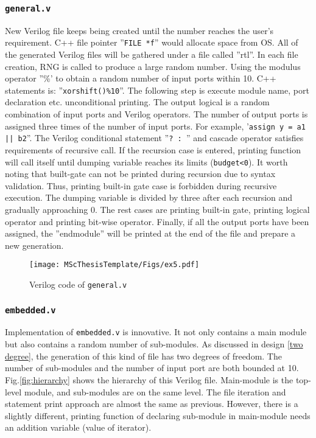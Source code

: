 \subsubsection{\texttt{general.v}}
New Verilog file keeps being created until the number reaches the user's requirement. C++ file pointer ''\texttt{FILE *f}'' would allocate space from OS. All of the generated Verilog files will be gathered under a file called ''rtl''. In each file creation, RNG is called to produce a large random number. Using the modulus operator ''\%' to obtain a random number of input ports within 10. C++ statements is: ''\texttt{xorshift()\%10}''. The following step is execute module name, port declaration etc. unconditional printing. The output logical is a random combination of input ports and Verilog operators. The number of output ports is assigned three times of the number of input ports. For example, '\texttt{assign y = a1 || b2}''. The Verilog conditional statement ''\texttt{? : }'' and  cascade operator satisfies requirements of recursive call. If the recursion case is entered, printing function will call itself until dumping variable reaches its limits (\texttt{budget<0}). It worth noting that built-gate can not be printed during recursion due to syntax validation. Thus, printing built-in gate case is forbidden during recursive execution. The dumping variable is divided by three after each recursion and gradually approaching 0. The rest cases are printing built-in gate, printing logical operator and printing bit-wise operator. Finally, if all the output ports have been assigned, the ''endmodule'' will be printed at the end of the file and prepare a new generation.
\begin{figure}[htb]
    \centering
    \texttt{[image: MScThesisTemplate/Figs/ex5.pdf]}
    \caption{\footnotesize Verilog code of \texttt{general.v}}
\end{figure}
\subsubsection{\texttt{embedded.v}}
Implementation of \texttt{embedded.v} is innovative. It not only contains a main module but also contains a random number of sub-modules. As discussed in design \ref{two degree}, the generation of this kind of file has two degrees of freedom. The number of sub-modules and the number of input port are both bounded at 10. Fig.\ref{fig:hierarchy} shows the hierarchy of this Verilog file. Main-module is the top-level module, and sub-modules are on the same level. The file iteration and statement print approach are almost the same as previous. However, there is a slightly different, printing function of declaring sub-module in main-module needs an addition variable (value of iterator).

